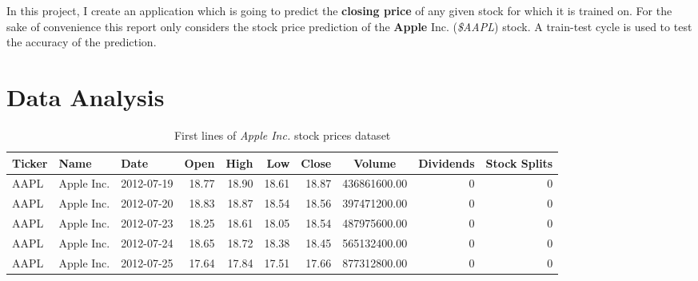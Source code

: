 \documentclass[fleqn,10pt]{SelfArx} %
\begin{document}
In this project, I create an application which is going to predict the \textbf{closing price} of any given stock for which it is trained on. For the sake of convenience this report only considers the stock price prediction of the \textbf{Apple} Inc. (\textit{\$AAPL}) stock. A train-test cycle is used to test the accuracy of the prediction.





\section{Data Analysis}

\begin{table*}[hbt]
	\caption{First lines of \textit{Apple Inc.} stock prices dataset}
	\centering
\begin{tabular}{lllrrrr S[table-auto-round,table-format=9.0] rr}
\toprule
Ticker &       Name &       Date &  Open &  High &   Low &  Close &       {Volume} &  Dividends &  Stock Splits \\
\midrule
  AAPL & Apple Inc. & 2012-07-19 & 18.77 & 18.90 & 18.61 &  18.87 & 436861600.00 &       0 &          0 \\
  AAPL & Apple Inc. & 2012-07-20 & 18.83 & 18.87 & 18.54 &  18.56 & 397471200.00 &       0 &          0 \\
  AAPL & Apple Inc. & 2012-07-23 & 18.25 & 18.61 & 18.05 &  18.54 & 487975600.00 &       0 &          0 \\
  AAPL & Apple Inc. & 2012-07-24 & 18.65 & 18.72 & 18.38 &  18.45 & 565132400.00 &       0 &          0 \\
  AAPL & Apple Inc. & 2012-07-25 & 17.64 & 17.84 & 17.51 &  17.66 & 877312800.00 &       0 &          0 \\
\bottomrule
\end{tabular}
	\label{tab:df.head}
\end{table*}
\end{document}
